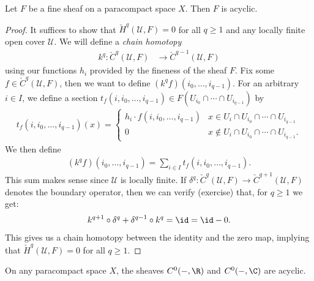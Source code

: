 \documentclass[11pt]{amsart}
\begin{document}
\begin{theorem}\label{thm:fine-sheaf-on-paracompact-is-acyclic}
Let $F$ be a fine sheaf on a paracompact space $X$. Then $F$ is acyclic.
\end{theorem}
\begin{proof} It suffices to show that $\check{H}^q(\mathcal{U},F)=0$ for all $q\ge1$ and any locally finite open cover $\mathcal{U}$. We will define a \emph{chain homotopy}
\begin{align*}
    k^q \colon \check{C}^q(\mathcal{U},F) &\to \check{C}^{q-1}(\mathcal{U},F)
\end{align*}
using our functions $h_i$ provided by the fineness of the sheaf $F$. Fix some $f\in \check{C}^q(\mathcal{U},F)$, then we want to define $(k^q f)(i_0, \ldots, i_{q-1})$. For an arbitrary $i\in I$, we define a section $t_f(i,i_0, \ldots, i_{q-1}) \in F(U_{i_0}\cap \cdots \cap U_{i_{q-1}})$ by
\begin{align*}
    t_f(i,i_0, \ldots, i_{q-1})(x) = \begin{cases} 
    h_i\cdot f(i,i_0, \ldots, i_{q-1}) &  x\in U_i\cap U_{i_0} \cap \cdots \cap U_{i_{q-1}}\\
   0 & x\notin U_i\cap U_{i_0} \cap \cdots \cap U_{i_{q-1}}. \end{cases}
\end{align*}
We then define
\begin{align*}
    (k^q f)(i_0, \ldots, i_{q-1}) = \sum_{i\in I} t_f(i,i_0, \ldots, i_{q-1}).
\end{align*}
This sum makes sense since $\mathcal{U}$ is locally finite. If $\delta^q \colon \check{C}^q(\mathcal{U},F) \to \check{C}^{q+1}(\mathcal{U},F)$ denotes the boundary operator, then we can verify (exercise) that, for $q\ge 1$ we get:
\begin{align*}
    k^{q+1}\circ \delta^q + \delta^{q-1}\circ k^q = \id = \id-0.
\end{align*}
This gives us a chain homotopy between the identity and the zero map, implying that $\check{H}^q(\mathcal{U},F) = 0$ for all $q\ge 1$.
\end{proof}

\begin{example}
    On any paracompact space $X$, the sheaves $C^0(-,\R)$ and $C^0(-,\C)$ are acyclic.
\end{example}
\end{document}

